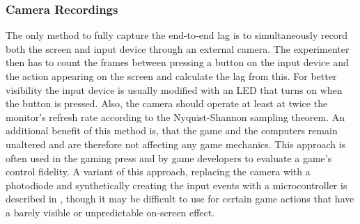 \subsubsection{Camera Recordings}

The only method to fully capture the end-to-end lag is to simultaneously record both the screen and input device through an external camera. The experimenter then has to count the frames between pressing a button on the input device and the action appearing on the screen and calculate the lag from this. For better visibility the input device is usually modified with an LED that turns on when the button is pressed. Also, the camera should operate at least at twice the monitor's refresh rate according to the Nyquist-Shannon sampling theorem. An additional benefit of this method is, that the game and the computers remain unaltered and are therefore not affecting any game mechanics. This approach is often used in the gaming press and by game developers to evaluate a game's control fidelity. A variant of this approach, replacing the camera with a photodiode and synthetically creating the input events with a microcontroller is described in \cite{beyermethod}, though it may be difficult to use for certain game actions that have a barely visible or unpredictable on-screen effect.








